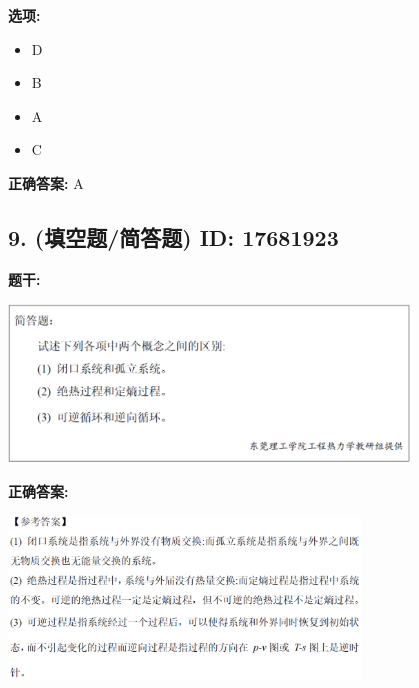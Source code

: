 \documentclass[12pt]{article}
\begin{document}
\textbf{选项:}
\begin{itemize}[leftmargin=*]
  \item D

  \item B

  \item A

  \item C

\end{itemize}

\textbf{正确答案:}
A

\vspace{0.5em}\hrulefill\vspace{1em}

\subsection*{9. (填空题/简答题) \small ID: 17681923}

\textbf{题干:}


\begin{center}\includegraphics[width=0.8\textwidth, height=0.25\textheight, keepaspectratio]{question_9_17681923/title_img_1.png}\end{center}

\textbf{正确答案:}

\begin{center}\includegraphics[width=0.7\textwidth, height=0.2\textheight, keepaspectratio]{question_9_17681923/correct_answer_1_img_1.png}\end{center}

\vspace{0.5em}\hrulefill\vspace{1em}
\end{document}

